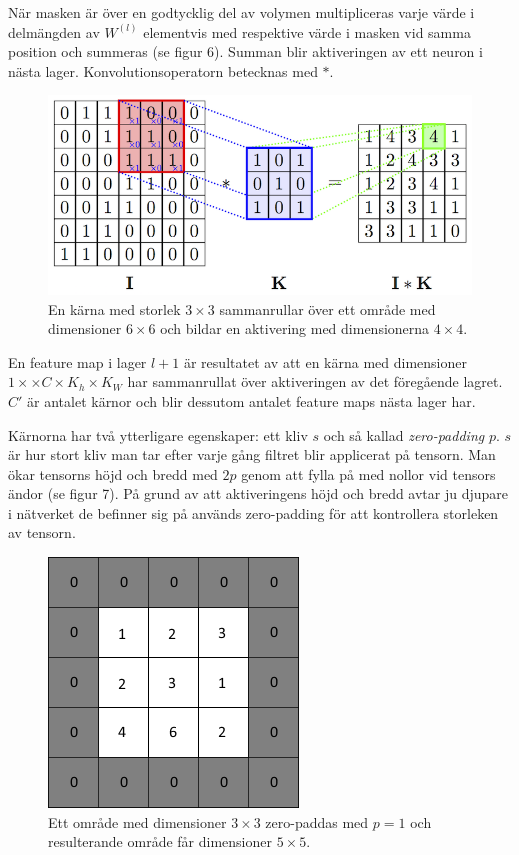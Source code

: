 \documentclass[a4paper,11pt,twoside]{article}
\begin{document}
När masken är över en godtycklig del av volymen multipliceras varje värde i delmängden av $W^{(l)}$ elementvis med respektive värde i masken vid samma position och summeras (se figur 6). Summan blir aktiveringen av ett neuron i nästa lager. Konvolutionsoperatorn betecknas med $*$. \cite{cs231n} \cite{convmath}

\begin{figure}[h]\label{figkonv}
	\centering
  		\includegraphics[scale=2.1]{convolution.png}
  	\caption{En kärna med storlek $3 \times 3$ sammanrullar över ett område med dimensioner $6 \times 6$ och bildar en aktivering med dimensionerna $4 \times 4$. \cite{figkonv}}
\end{figure}

En feature map i lager $l+1$ är resultatet av att en kärna med dimensioner $1 \times \times C  \times K_h \times K_W$ har sammanrullat över aktiveringen av det föregående lagret. $C'$ är antalet kärnor och blir dessutom antalet feature maps nästa lager har. \cite{cs231n} \cite{convmath}

Kärnorna har två ytterligare egenskaper: ett kliv $s$ och så kallad \textit{zero-padding} $p$. $s$ är hur stort kliv man tar efter varje gång filtret blir applicerat på tensorn. Man ökar tensorns höjd och bredd med $2p$ genom att fylla på med nollor vid tensors ändor (se figur 7). På grund av att aktiveringens höjd och bredd avtar ju djupare i nätverket de befinner sig på används zero-padding för att kontrollera storleken av tensorn. \cite{cs231n} \cite{convmath} \cite{convarithmetic}

\begin{figure}[h]\label{figzeropad}
	\centering
  		\includegraphics[scale=0.7]{zeropadding.png}
  	\caption{Ett område med dimensioner $3 \times 3$ zero-paddas med $p=1$ och resulterande område får dimensioner $5 \times 5$.}
\end{figure}
\end{document}

